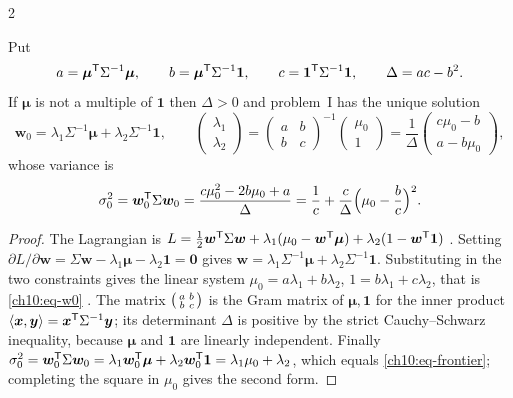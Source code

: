 \begin{paracol}{2}
\begin{theorem}\label{ch10:thm-mvo}
Put
\[
  a=\bm\mu^{\mathsf T}\Sigma^{-1}\bm\mu,\qquad b=\bm\mu^{\mathsf T}\Sigma^{-1}\bm 1,\qquad c=\bm 1^{\mathsf T}\Sigma^{-1}\bm 1,\qquad
  \Delta=ac-b^2 .
\]
If $\bm\mu$ is not a multiple of $\bm 1$ then $\Delta>0$ and problem~I has the unique solution
\begin{equation}\label{ch10:eq-w0}
  \bm w_0=\lambda_1\Sigma^{-1}\bm\mu+\lambda_2\Sigma^{-1}\bm 1,\qquad
  \begin{pmatrix}\lambda_1\\ \lambda_2\end{pmatrix}=\begin{pmatrix}a&b\\ b&c\end{pmatrix}^{-1}\begin{pmatrix}\mu_0\\ 1\end{pmatrix}
  =\frac1\Delta\begin{pmatrix}c\mu_0-b\\ a-b\mu_0\end{pmatrix},
\end{equation}
whose variance is
\begin{equation}\label{ch10:eq-frontier}
  \sigma_0^2=\bm w_0^{\mathsf T}\Sigma\bm w_0=\frac{c\mu_0^2-2b\mu_0+a}{\Delta}
  =\frac1c+\frac{c}{\Delta}\Bigl(\mu_0-\frac bc\Bigr)^2 .
\end{equation}
\end{theorem}
\begin{proof}
The Lagrangian is $L=\frac12\bm w^{\mathsf T}\Sigma\bm w+\lambda_1(\mu_0-\bm w^{\mathsf T}\bm\mu)+\lambda_2(1-\bm w^{\mathsf T}\bm 1)$
. Setting $\partial L/\partial\bm w=\Sigma\bm w-\lambda_1\bm\mu-\lambda_2\bm 1=\bm 0$ gives
$\bm w=\lambda_1\Sigma^{-1}\bm\mu+\lambda_2\Sigma^{-1}\bm 1$. Substituting in the two constraints gives the linear
system $\mu_0=a\lambda_1+b\lambda_2$, $1=b\lambda_1+c\lambda_2$, that is \eqref{ch10:eq-w0} .
The matrix $\begin{psmallmatrix}a&b\\b&c\end{psmallmatrix}$ is the Gram matrix of $\bm\mu,\bm 1$ for the inner
product $\langle\bm x,\bm y\rangle=\bm x^{\mathsf T}\Sigma^{-1}\bm y$; its determinant $\Delta$ is positive by the strict
Cauchy--Schwarz inequality, because $\bm\mu$ and $\bm 1$ are linearly independent. Finally
$\sigma_0^2=\bm w_0^{\mathsf T}\Sigma\bm w_0=\lambda_1\bm w_0^{\mathsf T}\bm\mu+\lambda_2\bm w_0^{\mathsf T}\bm 1=\lambda_1\mu_0+\lambda_2$, which
equals \eqref{ch10:eq-frontier}; completing the square in $\mu_0$ gives the second form.
\end{proof}


\end{paracol}

